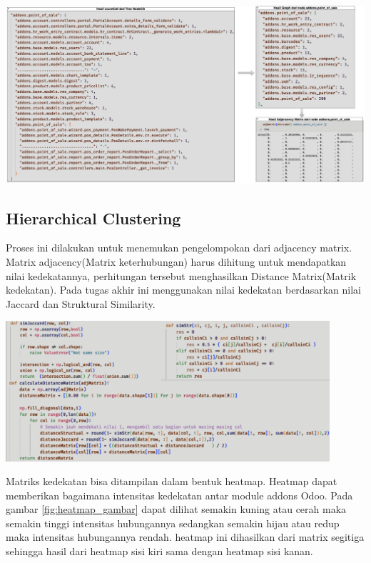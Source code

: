 \begin{center}
	\includegraphics[width=14cm]{img/bab_4/optimisasi_5.png}
	\label{fig:optimasi_5}
\end{center}


\subsection{Hierarchical Clustering}
Proses ini dilakukan untuk menemukan pengelompokan dari adjacency matrix. Matrix adjacency(Matrix keterhubungan) harus dihitung untuk mendapatkan nilai kedekatannya, perhitungan tersebut menghasilkan Distance Matrix(Matrik kedekatan). Pada tugas akhir ini menggunakan nilai kedekatan berdasarkan nilai Jaccard dan Struktural Similarity. 

\begin{center}
	\includegraphics[width=12cm]{img/bab_4/hc_1.png}
	\label{fig:hc_1}
\end{center}

Matriks kedekatan bisa ditampilan dalam bentuk heatmap. Heatmap dapat memberikan bagaimana intensitas kedekatan antar module addons Odoo. Pada gambar \ref{fig:heatmap_gambar} dapat dilihat semakin kuning atau cerah maka semakin tinggi intensitas hubungannya sedangkan semakin hijau atau redup maka intensitas hubungannya rendah. heatmap ini dihasilkan dari matrix segitiga sehingga hasil dari heatmap sisi kiri sama dengan heatmap sisi kanan.

